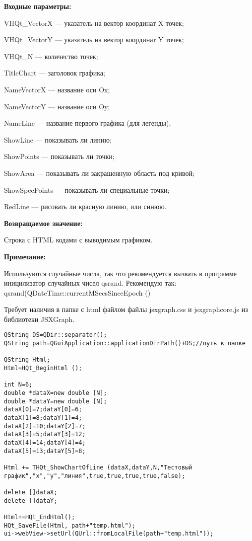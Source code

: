 \documentclass[a4paper,12pt]{article}
\begin{document}
\textbf{Входные параметры:}
 
    VHQt\_VectorX --- указатель на вектор координат X точек;
 
    VHQt\_VectorY --- указатель на вектор координат Y точек;
 
    VHQt\_N --- количество точек;
 
    TitleChart --- заголовок графика;
 
    NameVectorX --- название оси Ox;
 
    NameVectorY --- название оси Oy;
 
    NameLine --- название первого графика (для легенды);
 
    ShowLine --- показывать ли линию;
 
    ShowPoints --- показывать ли точки;
 
    ShowArea --- показывать ли закрашенную область под кривой;
 
    ShowSpecPoints --- показывать ли специальные точки;
 
    RedLine --- рисовать ли красную линию, или синюю.

\textbf{Возвращаемое значение:}

Строка с HTML кодами с выводимым графиком.

\textbf{Примечание:}

Используются случайные числа, так что рекомендуется вызвать в программе иницилизатор случайных чисел qsrand. Рекомендую так: qsrand(QDateTime::currentMSecsSinceEpoch () %

Требует наличия в папке с html файлом файлы jsxgraph.css и jsxgraphcore.js из библиотеки JSXGraph.


\begin{lstlisting}[label=code_use_THQt_ShowChartOfLine,caption=Пример использования]
QString DS=QDir::separator();
QString path=QGuiApplication::applicationDirPath()+DS;//путь к папке

QString Html;
Html=HQt_BeginHtml ();

int N=6;
double *dataX=new double [N];
double *dataY=new double [N];
dataX[0]=7;dataY[0]=6;
dataX[1]=8;dataY[1]=4;
dataX[2]=10;dataY[2]=7;
dataX[3]=5;dataY[3]=12;
dataX[4]=14;dataY[4]=4;
dataX[5]=13;dataY[5]=8;

Html += THQt_ShowChartOfLine (dataX,dataY,N,"Тестовый график","x","y","линия",true,true,true,true,false);

delete []dataX;
delete []dataY;

Html+=HQt_EndHtml();
HQt_SaveFile(Html, path+"temp.html");
ui->webView->setUrl(QUrl::fromLocalFile(path+"temp.html"));
\end{lstlisting}
\end{document}
